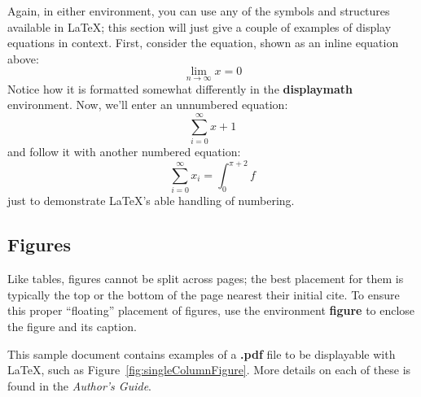 \documentclass[sigplan,screen,nonacm]{acmart}
\begin{document}
Again, in either environment, you can use any of the symbols and
structures available in \LaTeX\@; this section will just give a couple
of examples of display equations in context.  First, consider the
equation, shown as an inline equation above:
\begin{equation}
  \lim_{n\rightarrow \infty}x=0
\end{equation}
Notice how it is formatted somewhat differently in
the \textbf{displaymath}
environment.  Now, we'll enter an unnumbered equation:
\begin{displaymath}
  \sum_{i=0}^{\infty} x + 1
\end{displaymath}
and follow it with another numbered equation:
\begin{equation}
  \sum_{i=0}^{\infty}x_i=\int_{0}^{\pi+2} f
\end{equation}
just to demonstrate \LaTeX's able handling of numbering.





\subsection{Figures}
\label{sec:figures}

Like tables, figures cannot be split across pages; the
best placement for them
is typically the top or the bottom of the page nearest
their initial cite.  To ensure this proper ``floating'' placement
of figures, use the environment
\textbf{figure} to enclose the figure and its caption.

This sample document contains examples of
a \textbf{.pdf} file to be displayable with \LaTeX, such as
Figure~\ref{fig:singleColumnFigure}.  More
details on each of these is found in the \textit{Author's Guide}.
\end{document}
